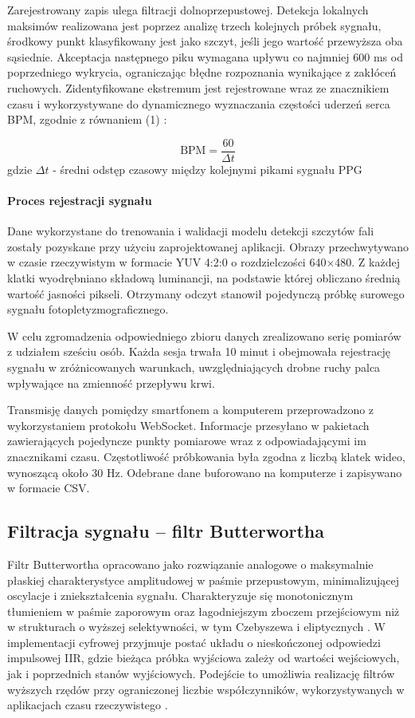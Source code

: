 \documentclass[journal]{IEEEtran}
\begin{document}
\newpage
Zarejestrowany zapis ulega filtracji dolnoprzepustowej. Detekcja lokalnych maksimów realizowana jest poprzez analizę trzech kolejnych próbek sygnału, środkowy punkt klasyfikowany jest jako szczyt, jeśli jego wartość przewyższa oba sąsiednie. Akceptacja następnego piku wymagana upływu co najmniej 600 ms od poprzedniego wykrycia, ograniczając błędne rozpoznania wynikające z zakłóceń ruchowych. Zidentyfikowane ekstremum jest rejestrowane wraz ze znacznikiem czasu i wykorzystywane do dynamicznego wyznaczania częstości uderzeń serca BPM, zgodnie z równaniem (1) :

\begin{equation}
\text{BPM} = \frac{60}{\Delta t}
\label{eq:bpm}
\end{equation}
gdzie $\Delta t$  - średni odstęp czasowy między kolejnymi pikami sygnału PPG

\paragraph{Proces rejestracji sygnału}
Dane wykorzystane do trenowania i walidacji modelu detekcji szczytów fali zostały pozyskane przy użyciu zaprojektowanej aplikacji. Obrazy przechwytywano w czasie rzeczywistym w formacie YUV 4:2:0 o rozdzielczości 640×480. Z każdej klatki wyodrębniano składową luminancji, na podstawie której obliczano średnią wartość jasności pikseli. Otrzymany odczyt stanowił pojedynczą próbkę surowego sygnału fotopletyzmograficznego.

W celu zgromadzenia odpowiedniego zbioru danych zrealizowano serię pomiarów z udziałem sześciu osób. Każda sesja trwała 10 minut i obejmowała rejestrację sygnału w zróżnicowanych warunkach, uwzględniających drobne ruchy palca wpływające na zmienność przepływu krwi.

\newpage
Transmisję danych pomiędzy smartfonem a komputerem przeprowadzono z wykorzystaniem protokołu WebSocket. Informacje przesyłano w pakietach zawierających pojedyncze punkty pomiarowe wraz z odpowiadającymi im znacznikami czasu. Częstotliwość próbkowania była zgodna z liczbą klatek wideo, wynoszącą około 30 Hz. Odebrane dane buforowano na komputerze i zapisywano w formacie CSV.

\subsection{Filtracja sygnału – filtr Butterwortha}
Filtr Butterwortha opracowano jako rozwiązanie analogowe o maksymalnie płaskiej charakterystyce amplitudowej w paśmie przepustowym, minimalizującej oscylacje i zniekształcenia sygnału. Charakteryzuje się monotonicznym tłumieniem w paśmie zaporowym oraz łagodniejszym zboczem przejściowym niż w strukturach o wyższej selektywności, w tym Czebyszewa i eliptycznych \cite{16}. W implementacji cyfrowej przyjmuje postać układu o nieskończonej odpowiedzi impulsowej IIR, gdzie bieżąca próbka wyjściowa zależy od wartości wejściowych, jak i poprzednich stanów wyjściowych. Podejście to umożliwia realizację filtrów wyższych rzędów przy ograniczonej liczbie współczynników, wykorzystywanych w aplikacjach czasu rzeczywistego \cite{17}.
\end{document}
